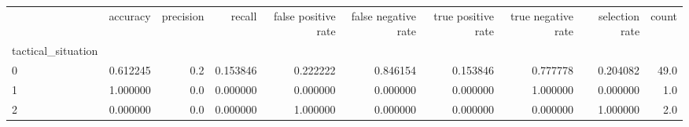 \begin{tabular}{lrrrrrrrrr}
\toprule
{} &  accuracy &  precision &    recall &  false positive rate &  false negative rate &  true positive rate &  true negative rate &  selection rate &  count \\
tactical\_situation &           &            &           &                      &                      &                     &                     &                 &        \\
\midrule
0                  &  0.612245 &        0.2 &  0.153846 &             0.222222 &             0.846154 &            0.153846 &            0.777778 &        0.204082 &   49.0 \\
1                  &  1.000000 &        0.0 &  0.000000 &             0.000000 &             0.000000 &            0.000000 &            1.000000 &        0.000000 &    1.0 \\
2                  &  0.000000 &        0.0 &  0.000000 &             1.000000 &             0.000000 &            0.000000 &            0.000000 &        1.000000 &    2.0 \\
\bottomrule
\end{tabular}
